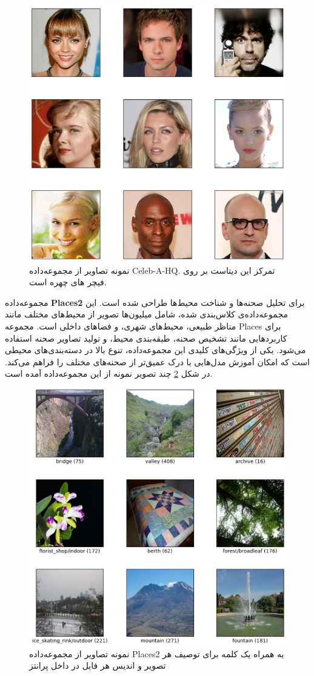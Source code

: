 \begin{figure}
	\centering
	\includegraphics[width=0.7\linewidth]{celebahq1}
	\caption{نمونه تصاویر از مجموعه‌داده Celeb-A-HQ. تمرکز این دیتاست بر روی فیچر های چهره است.}
	\label{fig:celebahq1}
\end{figure}

مجموعه‌داده \textbf{Places2}
\cite{zhouPlacesImageDatabase2016}
برای تحلیل صحنه‌ها و شناخت محیط‌ها طراحی شده است. این مجموعه‌داده‌ی کلاس‌بندی شده، شامل میلیون‌ها تصویر از محیط‌های مختلف مانند مناظر طبیعی، محیط‌های شهری، و فضاهای داخلی است. مجموعه Places برای کاربردهایی مانند تشخیص صحنه، طبقه‌بندی محیط، و تولید تصاویر صحنه استفاده می‌شود. یکی از ویژگی‌های کلیدی این مجموعه‌داده، تنوع بالا در دسته‌بندی‌های محیطی است که امکان آموزش مدل‌هایی با درک عمیق‌تر از صحنه‌های مختلف را فراهم می‌کند. در شکل \ref{fig:places1} چند تصویر نمونه از این مجموعه‌داده آمده است.
\begin{figure}
	\centering
	\includegraphics[width=0.7\linewidth]{places1}
	\caption{نمونه تصاویر از مجموعه‌داده Places2 به همراه یک کلمه برای توصیف هر تصویر و اندیس هر فایل در داخل پرانتز}
	\label{fig:places1}
\end{figure}


